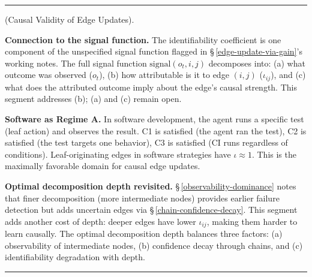\documentclass[11pt,oneside]{article}
\newcounter{claim}[section]
\renewcommand{\theclaim}{\thesection.\arabic{claim}}
\newenvironment{segment}[2]{%
  \refstepcounter{claim}%
  \bigskip\noindent\hrule\smallskip
  \noindent{\bfseries #1~\theclaim}\enskip(#2).\par\smallskip
  \noindent\ignorespaces
}{%
  \par\smallskip\noindent\hrule\bigskip
}
\newenvironment{scope}[1][]{\begin{segment}{Scope}{#1}}{\end{segment}}
\begin{document}
\begin{scope}[Causal Validity of Edge Updates]
\textbf{Connection to the signal function.} The identifiability coefficient is one component of the unspecified signal function flagged in \S\,\ref{edge-update-via-gain}'s working notes. The full signal function $\text{signal}(o_t, i, j)$ decomposes into: (a) what outcome was observed ($o_t$), (b) how attributable is it to edge $(i, j)$ ($\iota_{ij}$), and (c) what does the attributed outcome imply about the edge's causal strength. This segment addresses (b); (a) and (c) remain open.

\textbf{Software as Regime A.} In software development, the agent runs a specific test (leaf action) and observes the result. C1 is satisfied (the agent ran the test), C2 is satisfied (the test targets one behavior), C3 is satisfied (CI runs regardless of conditions). Leaf-originating edges in software strategies have $\iota \approx 1$. This is the maximally favorable domain for causal edge updates.

\textbf{Optimal decomposition depth revisited.} \S\,\ref{observability-dominance} notes that finer decomposition (more intermediate nodes) provides earlier failure detection but adds uncertain edges via \S\,\ref{chain-confidence-decay}. This segment adds another cost of depth: deeper edges have lower $\iota_{ij}$, making them harder to learn causally. The optimal decomposition depth balances three factors: (a) observability of intermediate nodes, (b) confidence decay through chains, and (c) identifiability degradation with depth.

\end{scope}
\end{document}
